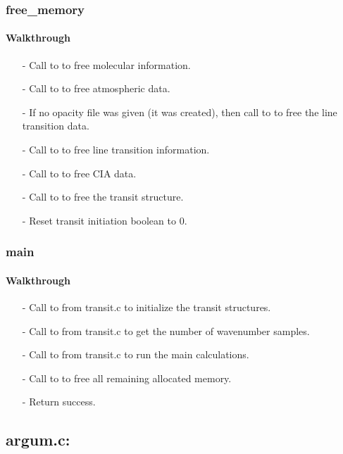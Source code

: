 \documentclass[letterpaper,12pt]{article}
\begin{document}
\subsubsection{free\_memory}
\paragraph{Walkthrough}
\begin{enumerate}[leftmargin=10pt, noitemsep, parsep=0pt, topsep=0ex]
\item[-] Call to  to free molecular information.
\item[-] Call to  to free atmospheric data.
\item[-] If no opacity file was given (it was created), then call to  to free the line transition data.
\item[-] Call to  to free line transition information.
\item[-] Call to  to free CIA data.
\item[-] Call to  to free the transit structure.
\item[-] Reset transit initiation boolean to 0.
\end{enumerate}

\subsubsection{main}
\paragraph{Walkthrough}
\begin{enumerate}[leftmargin=10pt, noitemsep, parsep=0pt, topsep=0ex]
\item[-] Call to  from transit.c to initialize the transit structures.
\item[-] Call to  from transit.c to get the number of wavenumber samples.
\item[-] Call to  from transit.c to run the main calculations.
\item[-] Call to  to free all remaining allocated memory.
\item[-] Return success.
\end{enumerate}

\subsection{argum.c:}
\end{document}
